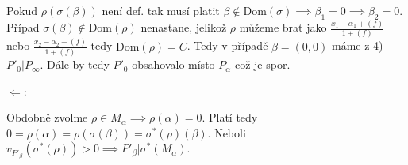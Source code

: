 \documentclass[12pt, a4paper]{article}
\begin{document}
\begin{enumerate}
    Pokud $\rho(\sigma(\beta))$ není def. tak musí platit $\beta \notin \text{Dom}(\sigma) \implies \beta_1 = 0 \implies \beta_2 = 0$. Případ $\sigma(\beta) \notin \text{Dom}(\rho)$ nenastane, jelikož $\rho$ můžeme brat jako $\frac{x_1-\alpha_1+(f)}{1+(f)}$ nebo $\frac{x_2-\alpha_2+(f)}{1+(f)}$ tedy $\text{Dom}(\rho)=C$. Tedy v případě $\beta=(0,0)$ máme z 4) $P'_0 | P_\infty$. Dále by tedy $P'_0$ obsahovalo místo $P_\alpha$ což je spor.

    $\Leftarrow$:

    Obdobně zvolme $\rho \in M_\alpha \implies \rho(\alpha) = 0$. Platí tedy $0 = \rho(\alpha) = \rho(\sigma(\beta)) = \sigma^*(\rho)(\beta)$. Neboli $v_{P'_\beta}(\sigma^*(\rho)) > 0 \implies P'_\beta | \sigma^*(M_\alpha)$.
\end{enumerate}
\end{document}
